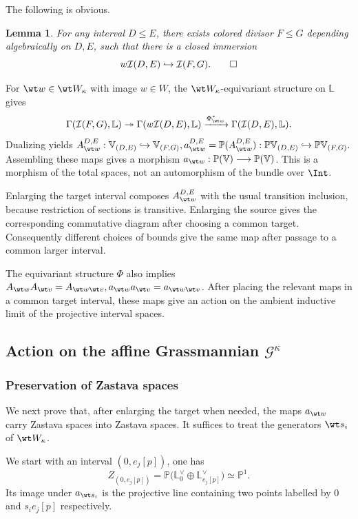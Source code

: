 \documentclass{amsart}
\numberwithin{equation}{section}
\numberwithin{figure}{section}
\newtheorem{lem}[thm]{Lemma}
\theoremstyle{definition}
\theoremstyle{remark}
\renewcommand{\c}[1]{\mathcal{#1}}
\renewcommand{\b}[1]{\mathbb{#1}}
\begin{document}
The following is obvious.
\begin{lem}
	\label{lem:tits-interval-bounds}
	For any interval $D\leq E$, there exists colored divisor $F\le G$ depending algebraically on $D,E$, such that there is a closed immersion
	\[
	w\c I(D,E)\hookrightarrow\c I(F,G).\qed
	\]
\end{lem}

For $\wt w\in \wt W_\kappa$ with image $w\in W$, the $\wt W_\kappa$-equivariant structure on $\b L$ gives
$$\Gamma(\c I(F,G),\b L)
\twoheadrightarrow\Gamma(w\c I(D,E),\b L)
\xrightarrow{\Phi_{\wt w}^*}\Gamma(\c I(D,E),\b L).$$
Dualizing yields
$A_{\wt w}^{D,E}:\b V_{(D,E)}\hookrightarrow\b V_{(F,G)}, 
a_{\wt w}^{D,E}=\b P(A_{\wt w}^{D,E}): \b P\b V_{(D,E)}\hookrightarrow\b P\b V_{(F,G)}.$
Assembling these maps gives a morphism $a_{\wt w}:\b P(\b V)\longrightarrow\b P(\b V)$.
This is a morphism of the total spaces, not an automorphism of the bundle over $\Int$.

Enlarging the target interval composes
$A_{\wt w}^{D,E}$ with the usual transition inclusion,
because restriction of sections is transitive.
Enlarging the source gives the corresponding commutative
diagram after choosing a common target.
Consequently different choices of bounds give the same
map after passage to a common larger interval.

The equivariant structure $\Phi$ also implies
$A_{\wt w}A_{\wt v}=A_{\wt w\wt v}, a_{\wt w}a_{\wt v}=a_{\wt w\wt v}$.
After placing the relevant maps in a common target interval, these maps give an action on the ambient
inductive limit of the projective interval spaces.

\subsection{Action on the affine Grassmannian $\c G^\kappa$}
\label{subsec:general-tits-action}
\subsubsection{Preservation of Zastava spaces}
We next prove that, after enlarging the target when needed,
the maps $a_{\wt w}$ carry Zastava spaces into Zastava spaces.
It suffices to treat the generators $\wt s_i$ of $\wt W_\kappa$.

We start with an interval $(0,e_j[p])$, one has
\[
Z_{(0,e_j[p])}
=\b P\bigl(\b L_0^\vee\oplus\b L_{e_j[p]}^\vee\bigr)
\simeq\b P^1.
\]
Its image under $a_{\wt s_i}$
is the projective line containing two points
labelled by $0$ and $s_i e_j[p]$ respectively.
\end{document}
